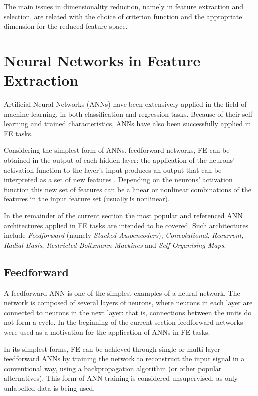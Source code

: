 \documentclass[9pt,journal,compsoc]{IEEEtran}
\begin{document}
The main issues in dimensionality reduction, namely in feature extraction and selection, are related with the choice of criterion function and the appropriate dimension for the reduced feature space.

\section{Neural Networks in Feature Extraction}\label{sec:anns_feature_extraction}

Artificial Neural Networks (ANNs) have been extensively applied in the field of machine learning, in both classification and regression tasks. Because of their self-learning and trained characteristics, ANNs have also been successfully applied in FE tasks.

Considering the simplest form of ANNs, feedforward networks, FE can be obtained in the output of each hidden layer: the application of the neurons' activation function to the layer's input produces an output that can be interpreted as a set of new features \cite{jain2000statistical}. Depending on the neurons' activation function this new set of features can be a linear or nonlinear combinations of the features in the input feature set (usually is nonlinear).

In the remainder of the current section the most popular and referenced ANN architectures applied in FE tasks are intended to be covered. Such architectures include \emph{Feedforward} (namely \emph{Stacked Autoencoders}), \emph{Convolutional}, \emph{Recurrent}, \emph{Radial Basis}, \emph{Restricted Boltzmann Machines} and \emph{Self-Organising Maps}\cite{jain2000statistical, masci2011stacked, kvascev2012radial, fabius2014variational, cho2014learning, marchi2017deep}.

\subsection{Feedforward}

A feedforward ANN is one of the simplest examples of a neural network. The network is composed of several layers of neurons, where neurons in each layer are connected to neurons in the next layer: that is, connections between the units do not form a cycle. In the beginning of the current section feedforward networks were used as a motivation for the application of ANNs in FE tasks.

In its simplest forms, FE can be achieved through single or multi-layer feedforward ANNs by training the network to reconstruct the input signal in a conventional way, using a backpropagation algorithm (or other popular alternatives). This form of ANN training is considered unsupervised, as only unlabelled data is being used.
\end{document}
